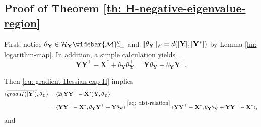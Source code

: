 \documentclass[11pt]{article}
\newcommand{\cH}{\mathcal{H}}
\newcommand{\0}{{\mathbf{0}}}
\newcommand{\1}{{\mathbf{1}}}
\newcommand{\X}{{\mathbf{X}}}
\newcommand{\Y}{{\mathbf{Y}}}
\newcommand{\cM}{{\cal M}}
\newcommand{\grad}{{\rm grad}}
\newcommand{\F}{{\rm F}}
\begin{document}
\subsection{Proof of Theorem \ref{th: H-negative-eigenvalue-region}}
	First, notice $\theta_\Y \in \cH_{\Y}  \widebar{\cM}_{r+}^q $ and  $\|\theta_\Y \|_\F = d([\Y], [\Y^*])$ by Lemma \ref{lm: logarithm-map}. In addition, a simple calculation yields
	\begin{equation} \label{eq: dist-relation}
		\Y \Y^\top - \X^* + \theta_\Y \theta_\Y^\top = \Y \theta_\Y^\top + \theta_\Y \Y^\top.
	\end{equation}
	
 Then \eqref{eq: gradient-Hessian-exp-H} implies 
	\begin{equation} \label{eq: H-gradient-quadratic}
	\begin{split}
		\langle\overline{\grad\, H([\Y])}, \theta_\Y \rangle &= \langle 2 (\Y \Y^\top - \X^* ) \Y, \theta_\Y \rangle  \\
		& = \langle \Y \Y^\top - \X^*, \theta_\Y \Y^\top + \Y \theta_\Y^\top \rangle \overset{ \eqref{eq: dist-relation} }  = \langle  \Y \Y^\top - \X^* , \theta_\Y \theta_\Y^\top + \Y \Y^\top -\X^* \rangle,
	\end{split}
	\end{equation} and 
\end{document}
